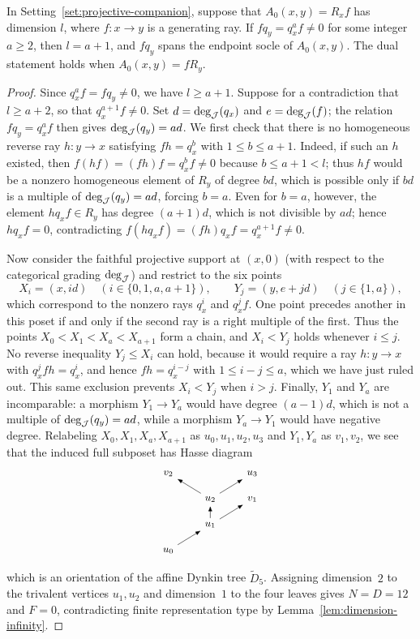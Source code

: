 \begin{lemma}
\label{lem:unequal-endpoint-action}
In Setting~\ref{set:projective-companion}, suppose that $A_0(x,y)=R_xf$ has dimension $l$, where $f\colon x\to y$ is a generating ray. If $fq_y=q_x^af\ne0$ for some integer $a\geq2$, then $l=a+1$, and $fq_y$ spans the endpoint socle of $A_0(x,y)$. The dual statement holds when $A_0(x,y)=fR_y$.
\end{lemma}
\begin{proof}
Since $q_x^af=fq_y\ne0$, we have $l\geq a+1$. Suppose for a contradiction that $l\geq a+2$, so that $q_x^{a+1}f\ne0$. Set $d=\deg_\mathcal J(q_x)$ and $e=\deg_\mathcal J(f)$; the relation $fq_y=q_x^af$ then gives $\deg_\mathcal J(q_y)=ad$. We first check that there is no homogeneous reverse ray $h\colon y\to x$ satisfying $fh=q_x^b$ with $1\leq b\leq a+1$. Indeed, if such an $h$ existed, then $f(hf)=(fh)f=q_x^bf\ne0$ because $b\leq a+1<l$; thus $hf$ would be a nonzero homogeneous element of $R_y$ of degree $bd$, which is possible only if $bd$ is a multiple of $\deg_\mathcal J(q_y)=ad$, forcing $b=a$. Even for $b=a$, however, the element $hq_xf\in R_y$ has degree $(a+1)d$, which is not divisible by $ad$; hence $hq_xf=0$, contradicting $f(hq_xf)=(fh)q_xf=q_x^{a+1}f\ne0$.

Now consider the faithful projective support at $(x,0)$ (with respect to the categorical grading $\deg_\mathcal J$) and restrict to the six points
\[
  X_i=(x,id)\quad (i\in\{0,1,a,a+1\}),\qquad
  Y_j=(y,e+jd)\quad (j\in\{1,a\}),
\]
which correspond to the nonzero rays $q_x^i$ and $q_x^jf$. One point precedes another in this poset if and only if the second ray is a right multiple of the first. Thus the points $X_0<X_1<X_a<X_{a+1}$ form a chain, and $X_i<Y_j$ holds whenever $i\leq j$. No reverse inequality $Y_j\leq X_i$ can hold, because it would require a ray $h\colon y\to x$ with $q_x^jfh=q_x^i$, and hence $fh=q_x^{i-j}$ with $1\leq i-j\leq a$, which we have just ruled out. This same exclusion prevents $X_i<Y_j$ when $i>j$. Finally, $Y_1$ and $Y_a$ are incomparable: a morphism $Y_1\to Y_a$ would have degree $(a-1)d$, which is not a multiple of $\deg_\mathcal J(q_y)=ad$, while a morphism $Y_a\to Y_1$ would have negative degree. Relabeling $X_0,X_1,X_a,X_{a+1}$ as $u_0,u_1,u_2,u_3$ and $Y_1,Y_a$ as $v_1,v_2$, we see that the induced full subposet has Hasse diagram
\[
\begin{tikzpicture}[x=1.3cm,y=.8cm,>=Latex,every node/.style={font=\small}]
\node (u0) at (0,0) {$u_0$}; \node (u1) at (1,1) {$u_1$};
\node (u2) at (1,2) {$u_2$}; \node (u3) at (2,3) {$u_3$};
\node (v2) at (0,3) {$v_2$}; \node (v1) at (2,2) {$v_1$};
\draw[->] (u0)--(u1); \draw[->] (u1)--(u2); \draw[->] (u2)--(u3);
\draw[->] (u2)--(v2); \draw[->] (u1)--(v1);
\end{tikzpicture}
\]
which is an orientation of the affine Dynkin tree $\widetilde D_5$. Assigning dimension~$2$ to the trivalent vertices $u_1,u_2$ and dimension~$1$ to the four leaves gives $N=D=12$ and $F=0$, contradicting finite representation type by Lemma~\ref{lem:dimension-infinity}.


\end{proof}
